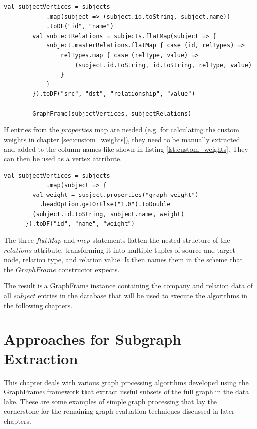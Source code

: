 \documentclass[
  a4paper,     %
  titlepage,   %
  oneside,     %
  parskip      %
]{scrartcl}          %
\begin{document}
    \begin{lstlisting}[style=scalaStyle,caption=extractGraph in $GraphExtractor$]
		val subjectVertices = subjects
			.map(subject => (subject.id.toString, subject.name))
			.toDF("id", "name")
		val subjectRelations = subjects.flatMap(subject => {
			subject.masterRelations.flatMap { case (id, relTypes) =>
				relTypes.map { case (relType, value) =>
					(subject.id.toString, id.toString, relType, value)
				}
			}
		}).toDF("src", "dst", "relationship", "value")

		GraphFrame(subjectVertices, subjectRelations)
    \end{lstlisting}

    If entries from the $properties$ map are needed (e.g. for calculating the custom weights in
    chapter \ref{sec:custom_weights}), they need to be manually extracted
    and added to the column names like shown in listing \ref{lst:custom_weights}.
    They can then be used as a vertex attribute.
    \begin{lstlisting}[style=scalaStyle,caption=Custom weight extraction,label=lst:custom_weights]
		val subjectVertices = subjects
			.map(subject => {
        val weight = subject.properties("graph_weight")
          .headOption.getOrElse("1.0").toDouble
        (subject.id.toString, subject.name, weight)
      }).toDF("id", "name", "weight")
    \end{lstlisting}

    The three $flatMap$ and $map$ statements flatten the nested structure of the $relations$ attribute,
    transforming it into multiple tuples of source and target node, relation type, and relation value.
    It then names them in the scheme that the $GraphFrame$ constructor expects.

    The result is a GraphFrame instance containing the company and relation data of all $subject$
    entries in the database that will be used to execute the algorithms in the following chapters.
    \pagebreak

  \section{Approaches for Subgraph Extraction}
  \label{sec:subgraph_extraction}
  This chapter deals with various graph processing algorithms developed using the
  GraphFrames framework that extract useful subsets of the full graph in the data lake.
  These are some examples of simple graph processing that lay the cornerstone
  for the remaining graph evaluation techniques discussed in later chapters.
\end{document}

